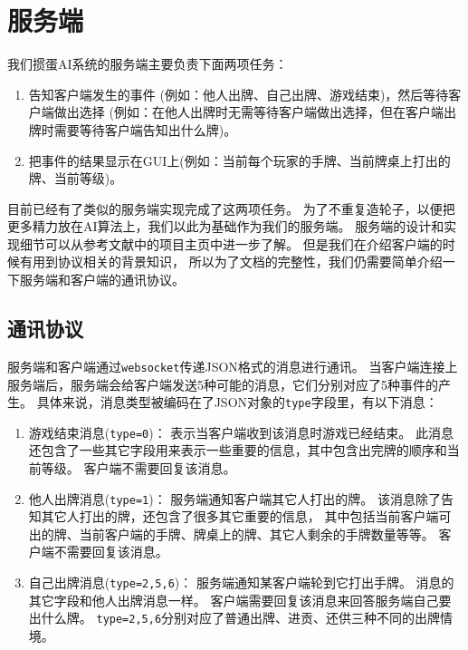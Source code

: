 \documentclass[a4paper]{ctexart}
\begin{document}
\section{服务端} \label{sec:server}
我们掼蛋AI系统的服务端主要负责下面两项任务：
\begin{enumerate}
  \item 告知客户端发生的事件 (例如：他人出牌、自己出牌、游戏结束)，然后等待客户端做出选择
  (例如：在他人出牌时无需等待客户端做出选择，但在客户端出牌时需要等待客户端告知出什么牌)。
  \item 把事件的结果显示在GUI上(例如：当前每个玩家的手牌、当前牌桌上打出的牌、当前等级)。
\end{enumerate}

目前已经有了类似的服务端实现\cite{jsai}完成了这两项任务。
为了不重复造轮子，以便把更多精力放在AI算法上，我们以此为基础作为我们的服务端。
服务端的设计和实现细节可以从参考文献中的项目主页\cite{jsai}中进一步了解。
但是我们在介绍客户端的时候有用到协议相关的背景知识，
所以为了文档的完整性，我们仍需要简单介绍一下服务端和客户端的通讯协议。

\subsection{通讯协议} \label{subset:protocal}
服务端和客户端通过\texttt{websocket}传递JSON格式的消息进行通讯。
当客户端连接上服务端后，服务端会给客户端发送5种可能的消息，它们分别对应了5种事件的产生。
具体来说，消息类型被编码在了JSON对象的\texttt{type}字段里，有以下消息：
\begin{enumerate}
  \item 游戏结束消息(\texttt{type=0})：
  表示当客户端收到该消息时游戏已经结束。
  此消息还包含了一些其它字段用来表示一些重要的信息，其中包含出完牌的顺序和当前等级。
  客户端不需要回复该消息。
  
  \item 他人出牌消息(\texttt{type=1})：
  服务端通知客户端其它人打出的牌。
  该消息除了告知其它人打出的牌，还包含了很多其它重要的信息，
  其中包括当前客户端可出的牌、当前客户端的手牌、牌桌上的牌、其它人剩余的手牌数量等等。
  客户端不需要回复该消息。
  
  \item 自己出牌消息(\texttt{type=2,5,6})：
  服务端通知某客户端轮到它打出手牌。
  消息的其它字段和他人出牌消息一样。
  客户端需要回复该消息来回答服务端自己要出什么牌。
  \texttt{type=2,5,6}分别对应了普通出牌、进贡、还供三种不同的出牌情境。
\end{enumerate}
\end{document}
